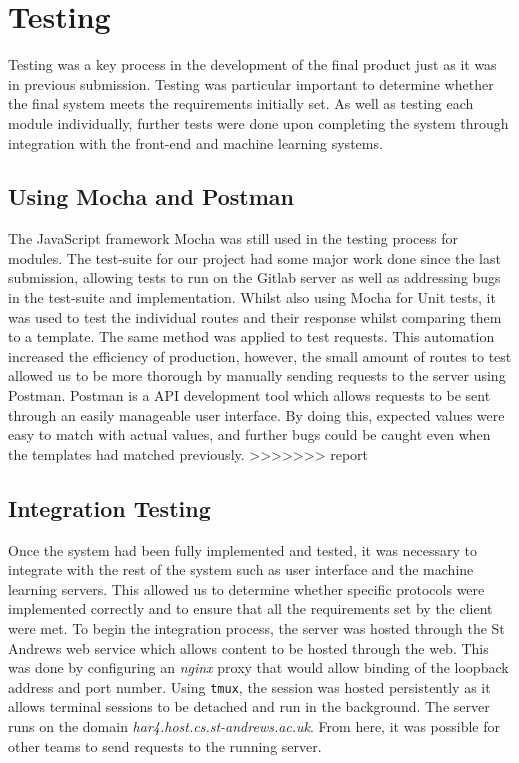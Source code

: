 \section{Testing}
Testing was a key process in the development of the final product just as it was in previous submission. Testing was particular important to determine whether the final system meets the requirements initially set. As well as testing each module individually, further tests were done upon completing the system through integration with the front-end and machine learning systems.

\subsection{Using Mocha and Postman}
The JavaScript framework Mocha was still used in the testing process for modules. The test-suite for our project had some major work done since the last submission, allowing tests to run on the Gitlab server as well as addressing bugs in the test-suite and implementation. Whilst also using Mocha for Unit tests, it was used to test the individual routes and their response whilst comparing them to a template. The same method was applied to test requests. This automation increased the efficiency of production, however, the small amount of routes to test allowed us to be more thorough by manually sending requests to the server using Postman. Postman is a API development tool which allows requests to be sent through an easily manageable user interface. By doing this, expected values were easy to match with actual values, and further bugs could be caught even when the templates had matched previously. 
>>>>>>> report
\subsection{Integration Testing}
Once the system had been fully implemented and tested, it was necessary to integrate with the rest of the system such as user interface and the machine learning servers. This allowed us to determine whether specific protocols were implemented correctly and to ensure that all the requirements set by the client were met. To begin the integration process, the server was hosted through the St Andrews web service which allows content to be hosted through the web. This was done by configuring an \textit{nginx} proxy that would allow binding of the loopback address and port number. Using \texttt{tmux}, the session was hosted persistently as it allows terminal sessions to be detached and run in the background. The server runs on the domain \textit{har4.host.cs.st-andrews.ac.uk}. From here, it was possible for other teams to send requests to the running server. 
